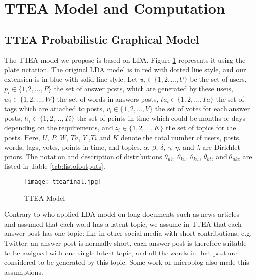 {{{{{{{\section{TTEA Model and Computation}
\subsection{TTEA Probabilistic Graphical Model}

The TTEA model we propose is based on LDA. Figure \ref{fig:tteamodel} represents it using the plate notation. The original LDA model is in red with dotted line style, and our extension is in blue with solid line style. Let $u_i \in \{1, 2,..., U\}$ be the set of users, $p_i \in \{1, 2,..., P\}$ the set of answer posts, which are generated by these users, $w_i \in \{1, 2,..., W\}$ the set of words in answers posts, $ta_i \in \{1, 2,..., Ta\}$ the set of tags which are attached to posts, $v_i \in \{1, 2,..., V\}$ the set of votes for each answer posts, $ti_i \in \{1, 2,..., Ti\}$ the set of points in time which could be months or days depending on the requirements, and $z_i \in \{1, 2,..., K\}$ the set of topics for the posts. Here, $U$, $P$, $W$, $Ta$, $V$ ,$Ti$ and $K$ denote the total number of users, posts, words, tags, votes, points in time, and topics. $\alpha$, $\beta$, $\delta$, $\gamma$, $\eta$, and $\lambda$ are Dirichlet priors. The notation and description of distributions $\theta_{uk}$, $\theta_{kv}$, $\theta_{kw}$, $\theta_{kt}$, and $\theta_{uke}$ are listed in Table \ref{tab:listofoutputs}.

\begin{figure}
\centering
\texttt{[image: tteafinal.jpg]}  
\caption{TTEA Model}
\label{fig:tteamodel} 
\end{figure}


Contrary to \cite{blei2003latent} who applied LDA model on long documents such as news articles and assumed that each word has a latent topic, we assume in TTEA that each answer post has one topic: like in other social media with short contributions, e.g. Twitter, an answer post is normally short, each answer post is therefore suitable to be assigned with one single latent topic, and all the words in that post are considered to be generated by this topic. Some work\cite{chp7zhao2011comparing}\cite{chp7diao2012finding} on microblog also made this assumptions.

}}}}}}}
